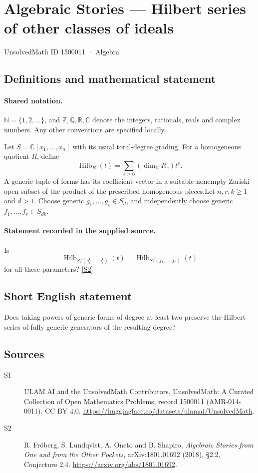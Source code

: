 \documentclass[11pt]{article}
\newcommand{\sref}[2]{\hyperlink{source:#1:#2}{[S#2]}}
\begin{document}
\setcounter{section}{1500010}
\section{Algebraic Stories — Hilbert series of other classes of ideals}\label{1500011}
{\small\sffamily UnsolvedMath ID 1500011 · Algebra}
\subsection{Definitions and mathematical statement}

\paragraph{Shared notation.}$\mathbb N=\{1,2,\ldots\}$, and $\mathbb Z,\mathbb Q,\mathbb R,\mathbb C$ denote the integers, rationals, reals and complex numbers. Any other conventions are specified locally.


Let $S=\mathbb C[x_1,\ldots,x_n]$ with its usual total-degree grading. For a homogeneous quotient $R$, define
\[\operatorname{Hilb}_R(t)=\sum_{e\geq0}(\dim_{\mathbb C}R_e)t^e.
\]
A generic tuple of forms has its coefficient vector in a suitable nonempty Zariski open subset of the product of the prescribed homogeneous pieces.Let $n,r,k\geq1$ and $d>1$. Choose generic $g_1,\ldots,g_r\in S_d$, and independently choose generic $f_1,\ldots,f_r\in S_{dk}$.
\paragraph{Statement recorded in the supplied source.}
Is
\[\operatorname{Hilb}_{S/(g_1^k,\ldots,g_r^k)}(t)=\operatorname{Hilb}_{S/(f_1,\ldots,f_r)}(t)
\]
for all these parameters? \sref{1500011}{2}
\subsection{Short English statement}
Does taking powers of generic forms of degree at least two preserve the Hilbert series of fully generic generators of the resulting degree?
\subsection{Sources}
\begin{description}
\item[\hypertarget{source:1500011:1}{S1}] ULAM.AI and the UnsolvedMath Contributors, UnsolvedMath: A Curated Collection of Open Mathematics Problems, record 1500011 (AMR-014-0011). CC BY 4.0. \url{https://huggingface.co/datasets/ulamai/UnsolvedMath}.
\item[\hypertarget{source:1500011:2}{S2}] R. Fröberg, S. Lundqvist, A. Oneto and B. Shapiro, \emph{Algebraic Stories from One and from the Other Pockets}, arXiv:1801.01692 (2018), §2.2, Conjecture 2.4. \url{https://arxiv.org/abs/1801.01692}.
\end{description}
\label{end:1500011}
\end{document}
